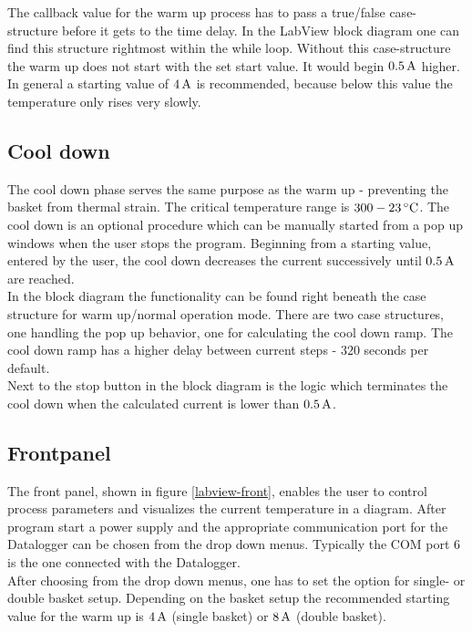 \documentclass[parskip,12pt,headsepline,a4paper] {scrbook}
\begin{document}
The callback value for the warm up process has to pass a true/false case-structure before it gets to the time delay. In the LabView block diagram one can find this structure rightmost within the while loop. Without this case-structure the warm up does not start with the set start value. It would begin $\unit[0.5]{A}$ higher. In general a starting value of $\unit[4]{A}$ is recommended, because below this value the temperature only rises very slowly.

\subsection{Cool down}
\vspace{-1\baselineskip}
The cool down phase serves the same purpose as the warm up - preventing the basket from thermal strain. The critical temperature range is $\unit[300 - 23]{^\circ C}$. The cool down is an optional procedure which can be manually started from a pop up windows when the user stops the program. Beginning from a starting value, entered by the user, the cool down decreases the current successively until $\unit[0.5]{A}$ are reached. \\
In the block diagram the functionality can be found right beneath the case structure for warm up/normal operation mode. There are two case structures, one handling the pop up behavior, one for calculating the cool down ramp. The cool down ramp has a higher delay between current steps - $320$ seconds per default. \\
Next to the stop button in the block diagram is the logic which terminates the cool down when the calculated current is lower than $\unit[0.5]{A}$.

\subsection{Frontpanel}
\vspace{-1\baselineskip}
The front panel, shown in figure \ref{labview-front}, enables the user to control process parameters and visualizes the current temperature in a diagram. After program start a power supply and the appropriate communication port for the Datalogger can be chosen from the drop down menus. Typically the COM port 6 is the one connected with the Datalogger. \\
After choosing from the drop down menus, one has to set the option for single- or double basket setup. Depending on the basket setup the recommended starting value for the warm up is $\unit[4]{A}$ (single basket) or $\unit[8]{A}$ (double basket).
\end{document}
